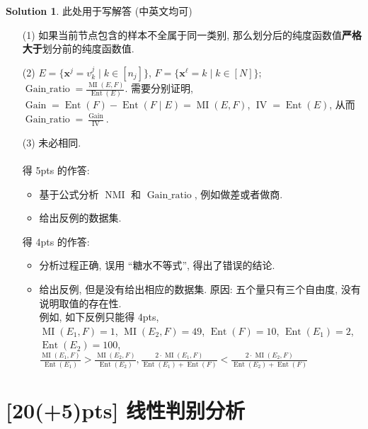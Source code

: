 \documentclass[a4paper]{article}
\numberwithin{equation}{section}
\theoremstyle{definition}
\newtheorem*{solution}{Solution}
\def \x {\bm{x}}
\def \MI {\operatorname{MI}}
\def \Ent {\operatorname{Ent}}
\begin{document}
\begin{solution}
    此处用于写解答 (中英文均可)
    \begin{itemize}
        \item[(1)] 如果当前节点包含的样本不全属于同一类别, 那么划分后的纯度函数值\textbf{严格大于}划分前的纯度函数值.
        \item[(2)] $E = \{\x^j = v^j_k \mid k \in [n_j]\}$, $F = \{\x^\ell = k \mid k \in [N]\}$; $\displaystyle \operatorname{Gain\_ratio} = \frac{\MI(E,F)}{\Ent(E)}$.
              需要分别证明, $\operatorname{Gain} = \Ent(F) - \Ent(F \mid E) = \MI(E, F)$, $\operatorname{IV} = \Ent(E)$, 从而 $\displaystyle \operatorname{Gain\_ratio} = \frac{\operatorname{Gain}}{\operatorname{IV}}$.
        \item[(3)] 未必相同. \\
              \phantom{PlaceHolder} \\
              得 5pts 的作答:
              \begin{itemize}
                  \item 基于公式分析 $\operatorname{NMI}$ 和 $\operatorname{Gain\_ratio}$, 例如做差或者做商.
                  \item 给出反例的数据集.
              \end{itemize}
              得 4pts 的作答:
              \begin{itemize}
                  \item 分析过程正确, 误用 ``糖水不等式'', 得出了错误的结论.
                  \item 给出反例, 但是没有给出相应的数据集. 原因: 五个量只有三个自由度, 没有说明取值的存在性. \\
                        例如, 如下反例只能得 4pts, \\
                        $\MI(E_1, F)=1$, $\MI(E_2, F)=49$, $\Ent(F)=10$, $\Ent(E_1)=2$, $\Ent(E_2)=100$, \\
                        $\displaystyle \frac{\MI(E_1,F)}{\Ent(E_1)} > \frac{\MI(E_2,F)}{\Ent(E_2)},
                            \frac{2 \cdot \MI(E_1,F)}{\Ent(E_1) + \Ent(F)} < \frac{2 \cdot \MI(E_2,F)}{\Ent(E_2) + \Ent(F)}$
              \end{itemize}
    \end{itemize}
\end{solution}

\newpage

\section{[20(+5)pts] 线性判别分析 }
\end{document}
